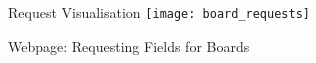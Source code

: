 



\begin{frame}[c]{Request Visualisation}
    \texttt{[image: board\_requests]}
\end{frame}

\begin{frame}[c,fragile]{Webpage: Requesting Fields for Boards}
    \footnotesize
    \inputminted[linenos=true]{javascript}{code/board_request.js}
\end{frame}

